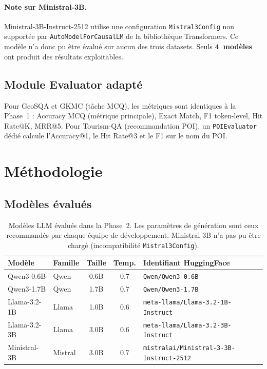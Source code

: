 \documentclass[12pt,a4paper]{article}
\begin{document}
\paragraph{Note sur Ministral-3B.}
Ministral-3B-Instruct-2512 utilise une configuration \texttt{Mistral3Config} non support\'ee
par \texttt{AutoModelForCausalLM} de la biblioth\`eque Transformers. Ce mod\`ele n'a donc
pu \^etre \'evalu\'e sur aucun des trois datasets. Seuls \textbf{4~mod\`eles} ont produit
des r\'esultats exploitables.

\subsection{Module Evaluator adapt\'e}

Pour GeoSQA et GKMC (t\^ache MCQ), les m\'etriques sont identiques \`a la Phase~1 :
Accuracy MCQ (m\'etrique principale), Exact Match, F1 token-level, Hit Rate@K, MRR@5.
Pour Tourism-QA (recommandation POI), un \texttt{POIEvaluator} d\'edi\'e calcule l'Accuracy@1,
le Hit Rate@3 et le F1 sur le nom du POI.

\section{M\'ethodologie}
\label{sec:methodologie}

\subsection{Mod\`eles \'evalu\'es}

\begin{table}[H]
\centering
\caption{Mod\`eles LLM \'evalu\'es dans la Phase~2. Les param\`etres de g\'en\'eration sont
  ceux recommand\'es par chaque \'equipe de d\'eveloppement. Ministral-3B n'a pas pu \^etre
  charg\'e (incompatibilit\'e \texttt{Mistral3Config}).}
\label{tab:modeles}
\begin{tabular}{@{} l l c c l @{}}
\toprule
\textbf{Mod\`ele} & \textbf{Famille} & \textbf{Taille} & \textbf{Temp.}
  & \textbf{Identifiant HuggingFace} \\
\midrule
Qwen3-0.6B   & Qwen    & 0.6B & 0.7 & \texttt{Qwen/Qwen3-0.6B} \\
\rowcolor{lightgray}
Qwen3-1.7B   & Qwen    & 1.7B & 0.7 & \texttt{Qwen/Qwen3-1.7B} \\
Llama-3.2-1B & Llama   & 1.0B & 0.6 & \texttt{meta-llama/Llama-3.2-1B-Instruct} \\
\rowcolor{lightgray}
Llama-3.2-3B & Llama   & 3.0B & 0.6 & \texttt{meta-llama/Llama-3.2-3B-Instruct} \\
Ministral-3B & Mistral & 3.0B & 0.7 & \texttt{mistralai/Ministral-3-3B-Instruct-2512} \\
\bottomrule
\end{tabular}
\end{table}
\end{document}
